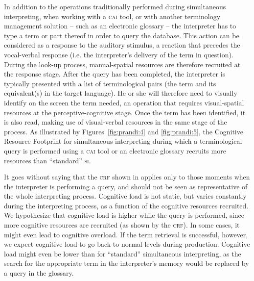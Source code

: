 \documentclass[output=paper]{langsci/langscibook}
\begin{document}
In addition to the operations traditionally performed during simultaneous interpreting, when working with a \textsc{cai} tool, or with another terminology management solution -- such as an electronic glossary -- the interpreter has to type a term or part thereof in order to query the database. This action can be considered as a response to the auditory stimulus, a reaction that precedes the vocal-verbal response (i.e. the interpreter’s delivery of the term in question). During the look-up process, manual-spatial resources are therefore recruited at the response stage. After the query has been completed, the interpreter is typically presented with a list of terminological pairs (the term and its equivalent(s) in the target language). He or she will therefore need to visually identify on the screen the term needed, an operation that requires visual-spatial resources at the perceptive-cognitive stage. Once the term has been identified, it is also read, making use of visual-verbal resources in the same stage of the process. As illustrated by Figures~\ref{fig:prandi:4} and \ref{fig:prandi:5}, the Cognitive Resource Footprint for simultaneous interpreting during which a terminological query is performed using a \textsc{cai} tool or an electronic glossary recruits more resources than ``standard'' \textsc{si}. 

It goes without saying that the \textsc{crf} shown in  applies only to those moments when the interpreter is performing a query, and should not be seen as representative of the whole interpreting process. Cognitive load is not static, but varies constantly during the interpreting process, as a function of the cognitive resources recruited. We hypothesize that cognitive load is higher while the query is performed, since more cognitive resources are recruited (as shown by the \textsc{crf}). In some cases, it might even lead to cognitive overload. If the term retrieval is successful, however, we expect cognitive load to go back to normal levels during production. Cognitive load might even be lower than for ``standard'' simultaneous interpreting, as the search for the appropriate term in the interpreter’s memory would be replaced by a query in the glossary.
\end{document}
